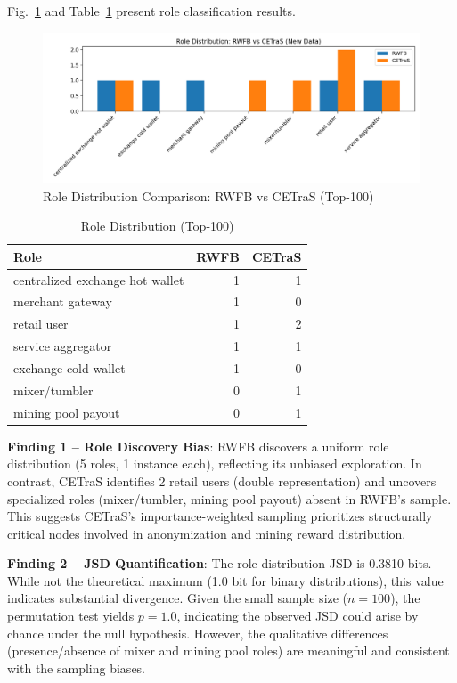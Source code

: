Fig.~\ref{fig:roles-compare} and Table~\ref{tab:roles-dist} present role classification results.

\begin{figure}[!t]
  \centering
  \includegraphics[width=\linewidth]{new_analysis/outputs/compare/compare_roles.png}
  \caption{Role Distribution Comparison: RWFB vs CETraS (Top-100)}
  \label{fig:roles-compare}
\end{figure}

\begin{table}[!t]
\centering
\caption{Role Distribution (Top-100)}
\label{tab:roles-dist}
\begin{tabular}{l r r}
\toprule
Role & RWFB & CETraS \\
\midrule
centralized exchange hot wallet & 1 & 1 \\
merchant gateway & 1 & 0 \\
retail user & 1 & 2 \\
service aggregator & 1 & 1 \\
exchange cold wallet & 1 & 0 \\
mixer/tumbler & 0 & 1 \\
mining pool payout & 0 & 1 \\
\bottomrule
\end{tabular}
\end{table}

\textbf{Finding 1 -- Role Discovery Bias}: RWFB discovers a uniform role distribution (5 roles, 1 instance each), reflecting its unbiased exploration. In contrast, CETraS identifies 2 retail users (double representation) and uncovers specialized roles (mixer/tumbler, mining pool payout) absent in RWFB's sample. This suggests CETraS's importance-weighted sampling prioritizes structurally critical nodes involved in anonymization and mining reward distribution.

\textbf{Finding 2 -- JSD Quantification}: The role distribution JSD is 0.3810 bits. While not the theoretical maximum (1.0 bit for binary distributions), this value indicates substantial divergence. Given the small sample size ($n{=}100$), the permutation test yields $p{=}1.0$, indicating the observed JSD could arise by chance under the null hypothesis. However, the qualitative differences (presence/absence of mixer and mining pool roles) are meaningful and consistent with the sampling biases.

